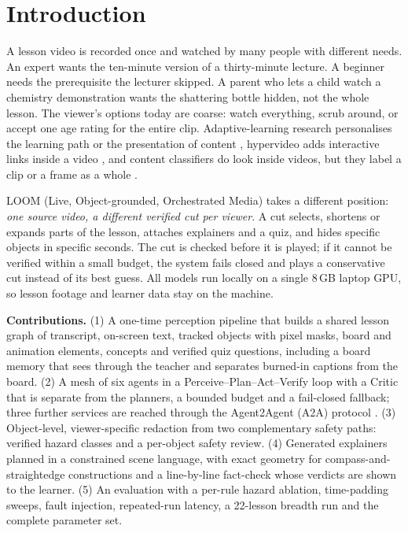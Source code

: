 \documentclass[conference,a4paper]{IEEEtran}
\begin{document}
\section{Introduction}
A lesson video is recorded once and watched by many people with different needs. An expert wants the ten-minute version
of a thirty-minute lecture. A beginner needs the prerequisite the lecturer skipped. A parent who lets a child watch a
chemistry demonstration wants the shattering bottle hidden, not the whole lesson. The viewer's options today are coarse:
watch everything, scrub around, or accept one age rating for the entire clip. Adaptive-learning research personalises
the learning path or the presentation of content \cite{sanal2024,hardaker2025}, hypervideo adds interactive links
inside a video \cite{cattaneo2019}, and content classifiers do look inside videos, but they label a clip or a frame as
a whole \cite{chuttur2022,yousaf2022}.

LOOM (Live, Object-grounded, Orchestrated Media) takes a different position: \emph{one source video, a different
verified cut per viewer}. A cut selects, shortens or expands parts of the lesson, attaches explainers and a quiz, and
hides specific objects in specific seconds. The cut is checked before it is played; if it cannot be verified within a
small budget, the system fails closed and plays a conservative cut instead of its best guess. All models run locally on
a single 8\,GB laptop GPU, so lesson footage and learner data stay on the machine.

\textbf{Contributions.} (1) A one-time perception pipeline that builds a shared lesson graph of transcript, on-screen
text, tracked objects with pixel masks, board and animation elements, concepts and verified quiz questions, including a
board memory that sees through the teacher and separates burned-in captions from the board. (2) A mesh of six agents in
a Perceive--Plan--Act--Verify loop with a Critic that is separate from the planners, a bounded budget and a fail-closed
fallback; three further services are reached through the Agent2Agent (A2A) protocol \cite{a2a}. (3) Object-level,
viewer-specific redaction from two complementary safety paths: verified hazard classes and a per-object safety review.
(4) Generated explainers planned in a constrained scene language, with exact geometry for compass-and-straightedge
constructions and a line-by-line fact-check whose verdicts are shown to the learner. (5) An evaluation with a
per-rule hazard ablation, time-padding sweeps, fault injection, repeated-run latency, a 22-lesson breadth run and the
complete parameter set.
\end{document}
